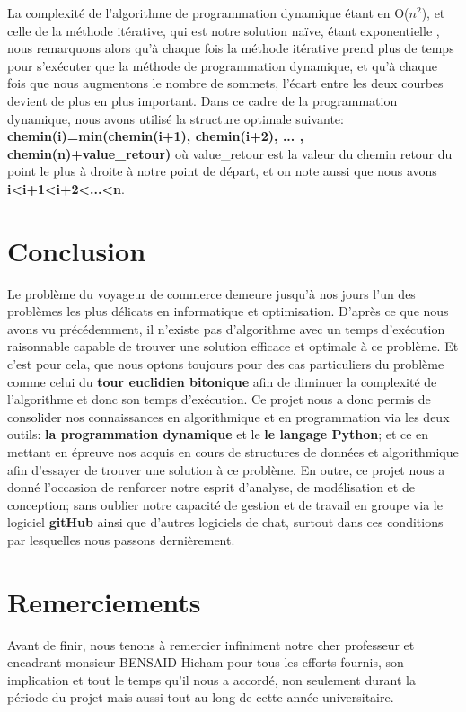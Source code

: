 \documentclass[12pt, openany]{report}
\begin{document}
La complexité de l'algorithme de programmation dynamique étant en O($n^2$), et celle de la méthode itérative, qui est notre solution naïve, étant exponentielle , nous remarquons alors qu'à chaque fois la méthode itérative prend plus de temps pour s'exécuter que la méthode de programmation dynamique, et qu'à chaque fois que nous augmentons le nombre de sommets, l'écart entre les deux courbes devient de plus en plus important.
Dans ce cadre de la programmation dynamique, nous avons utilisé la structure optimale suivante: \textbf{chemin(i)=min(chemin(i+1), chemin(i+2), ... , chemin(n)+value\_retour)} où value\_retour est la valeur du chemin retour du point le plus à droite à notre point de départ, et on note aussi que nous avons \textbf{i<i+1<i+2<...<n}.
\section{Conclusion}
Le problème du voyageur de commerce demeure jusqu'à nos jours l'un des problèmes les plus délicats en informatique et optimisation. D'après ce que nous avons vu précédemment, il n'existe pas d'algorithme avec un temps d'exécution raisonnable capable de trouver une solution efficace et optimale à ce problème. Et c'est pour cela, que nous optons toujours pour des cas particuliers du problème comme celui du \textbf{tour euclidien bitonique} afin de diminuer la complexité de l'algorithme et donc son temps d'exécution. Ce projet nous a donc permis de consolider nos connaissances en algorithmique et en programmation via les deux outils: \textbf{la programmation dynamique} et le \textbf{le langage Python}; et ce en mettant en épreuve nos acquis en cours de structures de données et algorithmique afin d'essayer de trouver une solution à ce problème. En outre, ce projet nous a donné l'occasion de renforcer notre esprit d'analyse, de modélisation et de conception; sans oublier notre capacité de gestion et de travail en groupe via le logiciel \textbf{gitHub} ainsi que d'autres logiciels de chat, surtout dans ces conditions par lesquelles nous passons dernièrement.
\section{Remerciements} 
Avant de finir, nous tenons à remercier infiniment notre cher professeur et encadrant monsieur BENSAID Hicham pour tous les efforts fournis, son implication et tout le temps qu'il nous a accordé, non seulement durant la période du projet mais aussi tout au long de cette année universitaire. 
\end{document}
